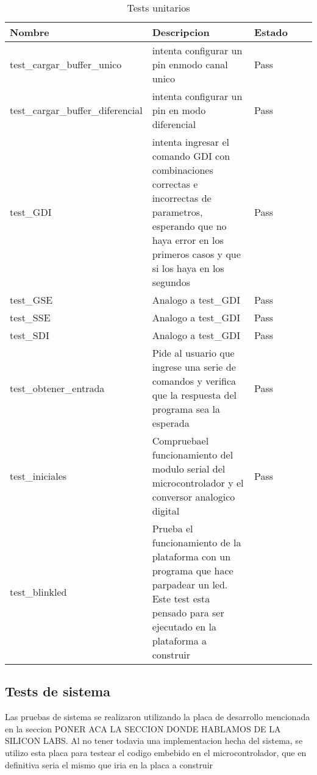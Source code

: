 \begin{table}[h]
\caption{Tests unitarios}
\label{it2:tab:tests_unitarios}
\begin{tabular}{|l|l|
>{\columncolor[HTML]{67FD9A}}l |ll}
\hline
\cellcolor[HTML]{68CBD0}Nombre & \cellcolor[HTML]{68CBD0}Descripcion & \cellcolor[HTML]{68CBD0}Estado &  &  \\ \hline
test\_cargar\_buffer\_unico & intenta configurar un pin enmodo canal unico & {\color[HTML]{009901} Pass} &  &  \\ \cline{1-3}
test\_cargar\_buffer\_diferencial & intenta configurar un pin en modo diferencial & {\color[HTML]{009901} Pass} &  &  \\ \cline{1-3}
test\_GDI & intenta ingresar el comando GDI con combinaciones correctas e incorrectas de parametros, esperando que no haya error en los primeros casos y que si los haya en los segundos & {\color[HTML]{009901} Pass} &  &  \\ \hline
test\_GSE & Analogo a test\_GDI & {\color[HTML]{009901} Pass} &  &  \\ \cline{1-3}
test\_SSE & Analogo a test\_GDI & {\color[HTML]{009901} Pass} &  &  \\ \cline{1-3}
test\_SDI & Analogo a test\_GDI & {\color[HTML]{009901} Pass} &  &  \\ \cline{1-3}
test\_obtener\_entrada & Pide al usuario que ingrese una serie de comandos y verifica que la respuesta del programa sea la esperada & {\color[HTML]{009901} Pass} &  &  \\ \cline{1-3}
test\_iniciales & Compruebael funcionamiento del modulo serial del microcontrolador y el conversor analogico digital & {\color[HTML]{009901} Pass} &  &  \\ \cline{1-3}
test\_blinkled & Prueba el funcionamiento de la plataforma con un programa que hace parpadear un led. Este test esta pensado para ser ejecutado en la plataforma a construir & \cellcolor[HTML]{FF9E9E}{\color[HTML]{CB0000} Fail} &  &  \\ \cline{1-3}
\end{tabular}
\end{table}


\subsection{Tests de sistema} %
\label{it2:sub:tests_de_sistema}

Las pruebas de sistema se realizaron utilizando la placa de desarrollo mencionada en la seccion PONER ACA LA SECCION DONDE HABLAMOS DE LA SILICON LABS. Al no tener todavia una implementacion hecha del sistema, se utilizo esta placa para testear el codigo embebido en el microcontrolador, que en definitiva seria el mismo que iria en la placa a construir

